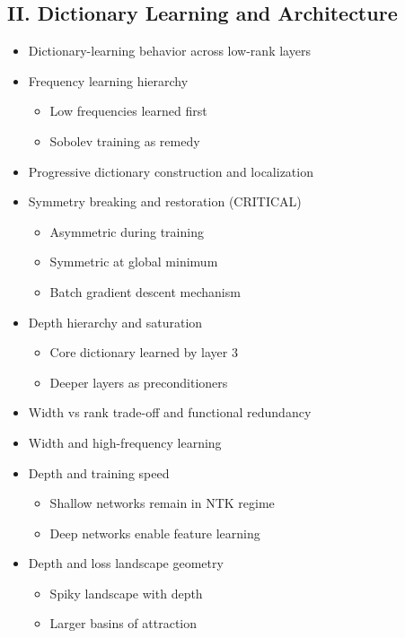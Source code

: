 \documentclass[12pt]{article}
\begin{document}
\subsection*{II. Dictionary Learning and Architecture}
\begin{itemize}
    \item Dictionary-learning behavior across low-rank layers
    \item Frequency learning hierarchy
    \begin{itemize}
        \item Low frequencies learned first
        \item Sobolev training as remedy
    \end{itemize}
    \item Progressive dictionary construction and localization
    \item Symmetry breaking and restoration (CRITICAL)
    \begin{itemize}
        \item Asymmetric during training
        \item Symmetric at global minimum
        \item Batch gradient descent mechanism
    \end{itemize}
    \item Depth hierarchy and saturation
    \begin{itemize}
        \item Core dictionary learned by layer 3
        \item Deeper layers as preconditioners
    \end{itemize}
    \item Width vs rank trade-off and functional redundancy
    \item Width and high-frequency learning
    \item Depth and training speed
    \begin{itemize}
        \item Shallow networks remain in NTK regime
        \item Deep networks enable feature learning
    \end{itemize}
    \item Depth and loss landscape geometry
    \begin{itemize}
        \item Spiky landscape with depth
        \item Larger basins of attraction
    \end{itemize}
\end{itemize}
\end{document}

